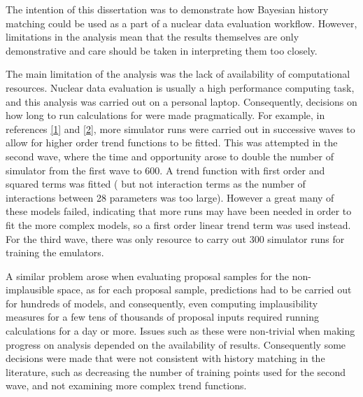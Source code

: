 \documentclass[
  12pt,
  a4paper,
  twoside]{book}
\begin{document}
The intention of this dissertation was to demonstrate how Bayesian history matching could be used as a part of a nuclear data evaluation workflow. However, limitations in the analysis mean that the results themselves are only demonstrative and care should be taken in interpreting them too closely.

The main limitation of the analysis was the lack of availability of computational resources. Nuclear data evaluation is usually a high performance computing task, and this analysis was carried out on a personal laptop. Consequently, decisions on how long to run calculations for were made pragmatically. For example, in references \protect\hyperlink{ref-jeremy_histmatch}{{[}1{]}} and \protect\hyperlink{ref-bower2010galaxy}{{[}2{]}}, more simulator runs were carried out in successive waves to allow for higher order trend functions to be fitted. This was attempted in the second wave, where the time and opportunity arose to double the number of simulator from the first wave to 600. A trend function with first order and squared terms was fitted ( but not interaction terms as the number of interactions between 28 parameters was too large). However a great many of these models failed, indicating that more runs may have been needed in order to fit the more complex models, so a first order linear trend term was used instead. For the third wave, there was only resource to carry out 300 simulator runs for training the emulators.

A similar problem arose when evaluating proposal samples for the non-implausible space, as for each proposal sample, predictions had to be carried out for hundreds of models, and consequently, even computing implausibility measures for a few tens of thousands of proposal inputs required running calculations for a day or more. Issues such as these were non-trivial when making progress on analysis depended on the availability of results. Consequently some decisions were made that were not consistent with history matching in the literature, such as decreasing the number of training points used for the second wave, and not examining more complex trend functions.
\end{document}
